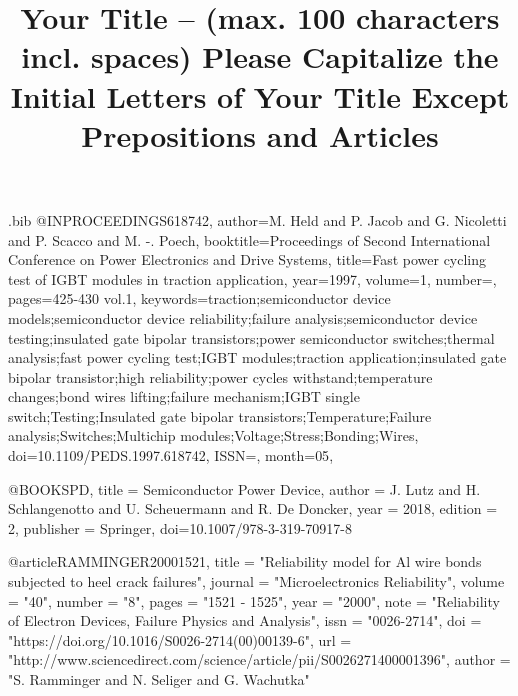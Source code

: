 
\begin{filecontents*}{\jobname.bib}
@INPROCEEDINGS{618742, 
author={M. Held and P. Jacob and G. Nicoletti and P. Scacco and M. -. Poech}, 
booktitle={Proceedings of Second International Conference on Power Electronics and Drive Systems}, 
title={Fast power cycling test of IGBT modules in traction application}, 
year={1997}, 
volume={1}, 
number={}, 
pages={425-430 vol.1}, 
keywords={traction;semiconductor device models;semiconductor device reliability;failure analysis;semiconductor device testing;insulated gate bipolar transistors;power semiconductor switches;thermal analysis;fast power cycling test;IGBT modules;traction application;insulated gate bipolar transistor;high reliability;power cycles withstand;temperature changes;bond wires lifting;failure mechanism;IGBT single switch;Testing;Insulated gate bipolar transistors;Temperature;Failure analysis;Switches;Multichip modules;Voltage;Stress;Bonding;Wires}, 
doi={10.1109/PEDS.1997.618742}, 
ISSN={}, 
month={05},}

@BOOK{SPD,
title = {Semiconductor Power Device},
author = {J. Lutz and H. Schlangenotto and U. Scheuermann and R. De Doncker},
year = {2018},
edition = {2},
publisher = {Springer},
doi={10.1007/978-3-319-70917-8}
}

@article{RAMMINGER20001521,
title = "Reliability model for Al wire bonds subjected to heel crack failures",
journal = "Microelectronics Reliability",
volume = "40",
number = "8",
pages = "1521 - 1525",
year = "2000",
note = "Reliability of Electron Devices, Failure Physics and Analysis",
issn = "0026-2714",
doi = "https://doi.org/10.1016/S0026-2714(00)00139-6",
url = "http://www.sciencedirect.com/science/article/pii/S0026271400001396",
author = "S. Ramminger and N. Seliger and G. Wachutka"
}
\end{filecontents*}

\documentclass{PCIM-Abstract}

\usepackage{flushend}

\usepackage{lipsum}
\usepackage{xcolor}



\title{Your Title – (max. 100 characters incl. spaces) Please Capitalize the Initial Letters of Your Title Except Prepositions and Articles}

